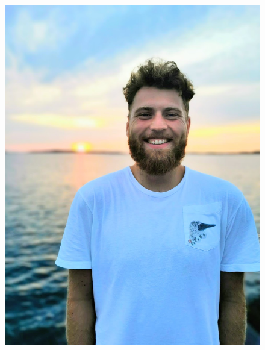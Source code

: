 \documentclass[a4paper,12pt,final]{memoir}
\begin{document}
%
\begin{figure}
	\hfill
	\includegraphics[width=1\columnwidth]{img/profile_pic.jpg}
	\vspace{-3.5cm}
\end{figure}
\end{document}
